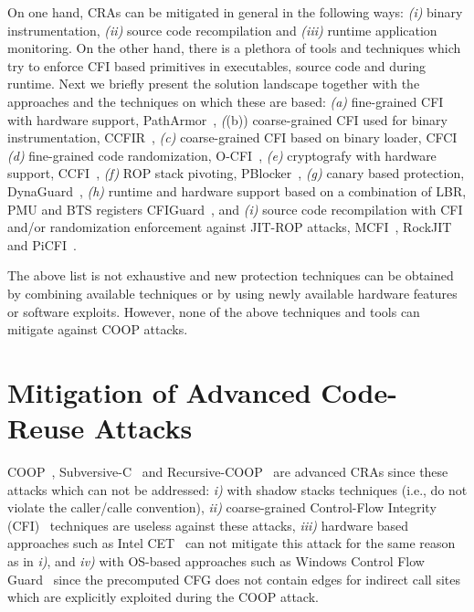On one hand, CRAs can be mitigated in general in the following ways: 
\textit{(i)} binary instrumentation,
\textit{(ii)} source code recompilation and 
\textit{(iii)} runtime application monitoring.
On the other hand, there is a plethora of tools and techniques which try to enforce CFI based
primitives in executables, source code and during runtime. Next we briefly
present the solution landscape together with the approaches and the techniques on which these are based:
\textit{(a)} fine-grained CFI with hardware support, PathArmor~\cite{veen:cfi},
\textit((b)) coarse-grained CFI used for binary instrumentation, CCFIR~\cite{ccfir:zhang},
\textit{(c)} coarse-grained CFI based on binary loader, CFCI~\cite{cfci:zhang}
\textit{(d)} fine-grained code randomization, O-CFI~\cite{mohan:opaque},
\textit{(e)} cryptografy with hardware support, CCFI~\cite{ccfi:jose},
\textit{(f)} ROP stack pivoting, PBlocker~\cite{pblocker:prakash},
\textit{(g)} canary based protection, DynaGuard~\cite{dynaguard:petsios},
\textit{(h)} runtime and hardware support based on a combination of LBR, PMU and BTS registers CFIGuard~\cite{cfiguard:yuan}, and
\textit{(i)} source code recompilation with CFI and/or randomization enforcement against JIT-ROP attacks, MCFI~\cite{mcfi:niu}, 
RockJIT~\cite{rockjit:niu} and PiCFI~\cite{perinput:niu}.

The above list is not exhaustive and new protection techniques can be obtained by combining available techniques
or by using newly available hardware features or software exploits. However, none of the above techniques and tools 
can mitigate against COOP attacks.

\section{Mitigation of Advanced Code-Reuse Attacks}
\label{Mitigation of Advanced Code-Reuse Attacks}

COOP~\cite{schuster:coop}, Subversive-C~\cite{subversive-c:lettner} and Recursive-COOP~\cite{crane:readactor++}
are advanced CRAs since these attacks which can not be addressed:
\textit{i)}  with shadow stacks techniques (i.e., do not violate the caller/calle convention), 
\textit{ii)} coarse-grained Control-Flow Integrity (CFI)~\cite{abadi:cfi2, abadi:cfi} techniques are useless against these attacks, 
\textit{iii)} hardware based approaches such as Intel CET~\cite{intel:cet} can not mitigate this attack for the same reason as in \textit{i)}, and 
\textit{iv)} with OS-based approaches such as Windows Control Flow Guard~\cite{windows:cfguard} 
since the precomputed CFG does not contain edges for indirect call sites which are explicitly exploited during the COOP attack.

